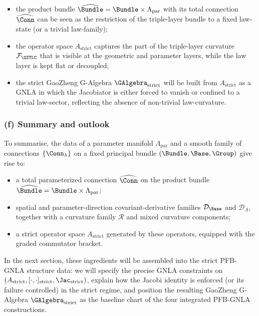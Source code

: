 \documentclass[11pt]{book}
\theoremstyle{plain}
\theoremstyle{definition}
\begin{document}
\begin{itemize}
  \item the product bundle $\widehat{\Bundle}=\Bundle\times\Lambda_{\mathrm{par}}$
        with its total connection $\widehat{\Conn}$ can be seen as the
        restriction of the triple-layer bundle to a fixed law-state
        (or a trivial law-family);
  \item the operator space $A_{\mathrm{strict}}$ captures the part of
        the triple-layer curvature $\mathcal{F}_{\GZTLC}$ that is
        visible at the geometric and parameter layers, while the law
        layer is kept flat or decoupled;
  \item the strict GaoZheng G-Algebra $\GAlgebra_{\mathrm{strict}}$
        will be built from $A_{\mathrm{strict}}$ as a GNLA in which the
        Jacobiator is either forced to vanish or confined to a trivial
        law-sector, reflecting the absence of non-trivial law-curvature.
\end{itemize}



\subsubsection*{(f) Summary and outlook}

To summarise, the data of a parameter manifold $\Lambda_{\mathrm{par}}$
and a smooth family of connections $\{\Conn_\lambda\}$ on a fixed
principal bundle $(\Bundle,\Base,\Group)$ give rise to:

\begin{itemize}
  \item a total parameterized connection $\widehat{\Conn}$ on the
        product bundle $\widehat{\Bundle}=\Bundle\times\Lambda_{\mathrm{par}}$;
  \item spatial and parameter-direction covariant-derivative families
        $\mathcal{D}_{\Base}$ and $\mathcal{D}_{\Lambda}$, together
        with a curvature family $\mathcal{R}$ and mixed curvature
        components;
  \item a strict operator space $A_{\mathrm{strict}}$ generated by these
        operators, equipped with the graded commutator bracket.
\end{itemize}

In the next section, these ingredients will be assembled into the
strict PFB-GNLA structure data: we will specify the precise GNLA
constraints on $(A_{\mathrm{strict}},[\cdot,\cdot]_{\mathrm{strict}},
\Jac_{\mathrm{strict}})$, explain how the Jacobi identity is enforced
(or its failure controlled) in the strict regime, and position the
resulting GaoZheng G-Algebra $\GAlgebra_{\mathrm{strict}}$ as the
baseline chart of the four integrated PFB-GNLA constructions.
\end{document}
